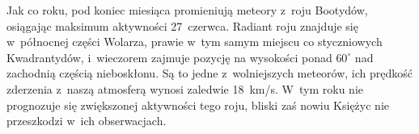 {\begin{dwieszpalty}
Jak co roku, pod koniec miesiąca promieniują meteory z~roju Bootydów, osiągając maksimum aktywności 27~czerwca. Radiant roju znajduje się w~północnej części Wolarza, prawie w~tym samym miejscu co styczniowych Kwadrantydów, i~wieczorem zajmuje pozycję na wysokości ponad $60^{\circ}$ nad zachodnią częścią nieboskłonu. Są to jedne z~wolniejszych meteorów, ich prędkość zderzenia z~naszą atmosferą wynosi zaledwie 18~km/s. W~tym roku nie prognozuje się zwiększonej aktywności tego roju, bliski zaś nowiu Księżyc nie przeszkodzi w~ich obserwacjach.

\medskip
{}
\end{dwieszpalty}

}\eject
\normalsize